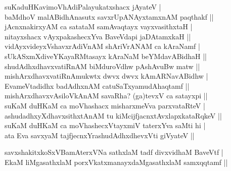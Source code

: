\begin{entry}
\begin{shl}
suKaduHKavimoVhAdiPalayukatxshacx jAyateV |\\[2pt]
baMdhoV malABidhAnasutx savxrUpANAyxtamxnAM paqthakf ||\\[2pt]
jAcnxnakirxyAM ca satataM samAvaqtayx vayxvasithxtaH |\\[2pt]
nitayxshacx vAyxpakashecxYva BaveVdapi jaDAtamxkaH ||\\[2pt]
vidAyxvideyxVshavxrAdiVnAM shAriVrANAM ca kAraNamf |\\[2pt]
sUkASxmXdiveYKayaRMtasayx kAraNaM beYMdavABidhaH ||\\[2pt]
shudAdhxdhavxvatiRnAM biMduroVdhw pAshAvuBw matw ||\\[2pt]
mishArxdhavxvatiRnAmukwtx dwvx dwvx kAmARNavABidhw |\\[2pt]
EvameVtadidhx badAdhxnAM catuSaTxyamudAhaqtamf ||\\[2pt]
mishArxdhavxvAsiloVkAnAM savaRha? (ga)tevxV ca satayxpi ||\\[2pt]
suKaM duHKaM ca moVhashacx misharxmeVva parxvataRteV |\\[2pt]
ashudadhxyXdhavxsithxtAnAM tu kiMcijfjacnxtAvxlapxkataRqkeV ||\\[2pt]
suKaM duHKaM ca moVhashecxVtayxmiV taterxYva saMti hi |\\[2pt]
ata Eva savxyaM tajfjecnxYrashudAdhxdhevxVti giVyateV ||\\[-1pt]
\end{shl}
\medskip
{}
\medskip
{}
\medskip
\begin{shl}
savxshakitxkoSxVBamAterxVNa sathxlaM tadf divxvidhaM BaveVtf |\\[2pt]
EkaM liMgasathxlaM porxVkatxmanayxdaMgasathxlaM samxqqtamf ||\\[-1pt]
\end{shl}
\medskip

\end{entry}
